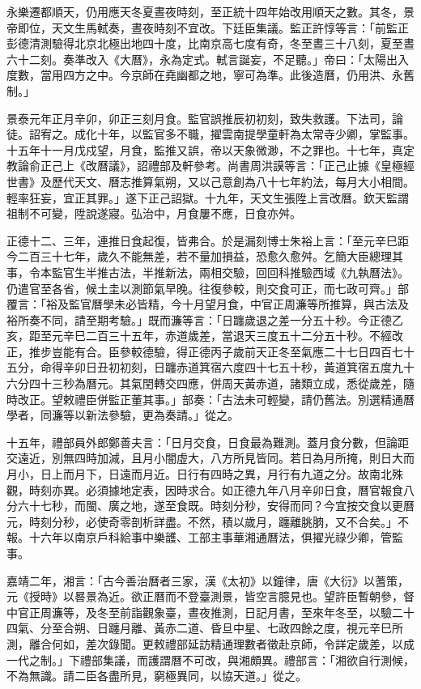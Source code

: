 永樂遷都順天，仍用應天冬夏晝夜時刻，至正統十四年始改用順天之數。其冬，景帝即位，天文生馬軾奏，晝夜時刻不宜改。下廷臣集議。監正許惇等言：「前監正彭德清測驗得北京北極出地四十度，比南京高七度有奇，冬至晝三十八刻，夏至晝六十二刻。奏準改入《大曆》，永為定式。軾言誕妄，不足聽。」帝曰：「太陽出入度數，當用四方之中。今京師在堯幽都之地，寧可為準。此後造曆，仍用洪、永舊制。」

景泰元年正月辛卯，卯正三刻月食。監官誤推辰初初刻，致失救護。下法司，論徒。詔宥之。成化十年，以監官多不職，擢雲南提學童軒為太常寺少卿，掌監事。十五年十一月戊戍望，月食，監推又誤，帝以天象微渺，不之罪也。十七年，真定教論俞正己上《改曆議》，詔禮部及軒參考。尚書周洪謨等言：「正己止據《皇極經世書》及歷代天文、曆志推算氣朔，又以己意創為八十七年約法，每月大小相間。輕率狂妄，宜正其罪。」遂下正己詔獄。十九年，天文生張陞上言改曆。欽天監謂祖制不可變，陞說遂寢。弘治中，月食屢不應，日食亦舛。

正德十二、三年，連推日食起復，皆弗合。於是漏刻博士朱裕上言：「至元辛巳距今二百三十七年，歲久不能無差，若不量加損益，恐愈久愈舛。乞簡大臣總理其事，令本監官生半推古法，半推新法，兩相交驗，回回科推驗西域《九執曆法》。仍遣官至各省，候土圭以測節氣早晚。往復參較，則交食可正，而七政可齊。」部覆言：「裕及監官曆學未必皆精，今十月望月食，中官正周濂等所推算，與古法及裕所奏不同，請至期考驗。」既而濂等言：「日躔歲退之差一分五十秒。今正德乙亥，距至元辛巳二百三十五年，赤道歲差，當退天三度五十二分五十秒。不經改正，推步豈能有合。臣參較德驗，得正德丙子歲前天正冬至氣應二十七日四百七十五分，命得辛卯日丑初初刻，日躔赤道箕宿六度四十七五十秒，黃道箕宿五度九十六分四十三秒為曆元。其氣閏轉交四應，併周天黃赤道，諸類立成，悉從歲差，隨時改正。望敕禮臣併監正董其事。」部奏：「古法未可輕變，請仍舊法。別選精通曆學者，同濂等以新法參驗，更為奏請。」從之。

十五年，禮部員外郎鄭善夫言：「日月交食，日食最為難測。蓋月食分數，但論距交遠近，別無四時加減，且月小闇虛大，八方所見皆同。若日為月所掩，則日大而月小，日上而月下，日遠而月近。日行有四時之異，月行有九道之分。故南北殊觀，時刻亦異。必須據地定表，因時求合。如正德九年八月辛卯日食，曆官報食八分六十七秒，而閩、廣之地，遂至食既。時刻分秒，安得而同？今宜按交食以更曆元，時刻分秒，必使奇零剖析詳盡。不然，積以歲月，躔離朓朒，又不合矣。」不報。十六年以南京戶科給事中樂頀、工部主事華湘通曆法，俱擢光祿少卿，管監事。

嘉靖二年，湘言：「古今善治曆者三家，漢《太初》以鐘律，唐《大衍》以蓍策，元《授時》以晷景為近。欲正曆而不登臺測景，皆空言臆見也。望許臣暫朝參，督中官正周濂等，及冬至前詣觀象臺，晝夜推測，日記月書，至來年冬至，以驗二十四氣、分至合朔、日躔月離、黃赤二道、昏旦中星、七政四餘之度，視元辛巳所測，離合何如，差次錄聞。更敕禮部延訪精通理數者徵赴京師，令詳定歲差，以成一代之制。」下禮部集議，而護謂曆不可改，與湘頗異。禮部言：「湘欲自行測候，不為無識。請二臣各盡所見，窮極異同，以協天道。」從之。

